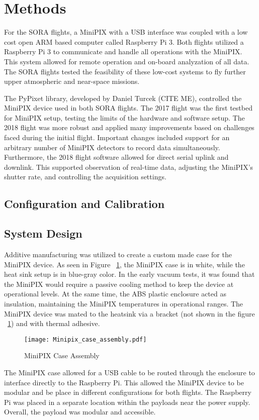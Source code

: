\section{Methods}
\label{Methods}
For the SORA flights, a MiniPIX with a USB interface was coupled with a low cost open ARM based computer called Raspberry Pi 3.  Both flights utilized a Raspberry Pi 3 to communicate and handle all operations with the MiniPIX.  This system allowed for remote operation and on-board analyzation of all data.  The SORA flights tested the feasibility of these low-cost systems to fly further upper atmospheric and near-space missions.  

The PyPixet library, developed by Daniel Turcek (CITE ME), controlled the MiniPIX device used in both SORA flights.  The 2017 flight was the first testbed for MiniPIX setup, testing the limits of the hardware and software setup.  The 2018 flight was more robust and applied many improvements based on challenges faced during the initial flight.  Important changes included support for an arbitrary number of MiniPIX detectors to record data simultaneously.  Furthermore, the 2018 flight software allowed for direct serial uplink and downlink. This supported observation of real-time data, adjusting the MiniPIX's shutter rate, and controlling the acquisition settings.

\subsection{Configuration and Calibration}
\subsection{System Design}
Additive manufacturing was utilized to create a custom made case for the MiniPIX device.  As seen in Figure ~\ref{fig:minipix_case}, the MiniPIX case is in white, while the heat sink setup is in blue-gray color.  In the early vacuum tests, it was found that the MiniPIX would require a passive cooling method to keep the device at operational levels.  At the same time, the ABS plastic enclosure acted as insulation, maintaining the MiniPIX temperatures in operational ranges.  The MiniPIX device was mated to the heatsink via a bracket (not shown in the figure ~\ref{fig:minipix_case}) and with thermal adhesive.
\begin{figure}[h]
    \centering
    \texttt{[image: Minipix\_case\_assembly.pdf]}
    \caption{MiniPIX Case Assembly}
    \label{fig:minipix_case}
\end{figure}
The MiniPIX case allowed for a USB cable to be routed through the enclosure to interface directly to the Raspberry Pi.  This allowed the MiniPIX device to be modular and be place in different configurations for both flights.  The Raspberry Pi was placed in a separate location within the payloads near the power supply.  Overall, the payload was modular and accessible.



